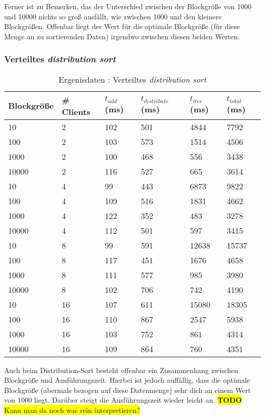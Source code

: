 \documentclass[fontsize=12pt,a4paper,headinclude=no,headings=small]{scrartcl}
\newcommand{\todo}[1]{\colorbox{yellow}{\textbf{TODO} #1}}
\begin{document}
Ferner ist zu Bemerken, das der Unterschied zwischen der Blockgröße von 1000 und 10000 nichts so groß ausfällt, wie zwischen 1000 und den kleinere Blockgrößen. Offenbar liegt der Wert für die optimale Blockgröße (für diese Menge an zu sortierenden Daten) irgendwo zwischen diesen beiden Werten.

\subsubsection{Verteiltes \textit{distribution sort}}
\begin{table}[htp]
\begin{tabularx}{\textwidth}{ |X|X|X|X|X|X| }
\hline
Blockgröße & \# Clients & $t_{add}$ (ms) & $t_{distribute}$ (ms) & $t_{iter}$ (ms) & $t_{total}$ (ms) \\
\hline
10 & 2 & 102 & 501 & 4844 & 7792 \\
100 & 2 & 103 & 573 & 1514 & 4506 \\
1000 & 2 & 100 & 468 & 556 & 3438 \\
10000 & 2 & 116 & 527 & 665 & 3614 \\
\hline
10 & 4 & 99 & 443 & 6873 & 9822 \\ 
100 & 4 & 109 & 516 & 1831 & 4662 \\ 
1000 & 4 & 122 & 352 & 483 & 3278 \\ 
10000 & 4 & 112 & 501 & 597 & 3415 \\
\hline
10 & 8 & 99 & 591 & 12638 & 15737 \\
100 & 8 & 117 & 451 & 1676 & 4658 \\
1000 & 8 & 111 & 577 & 985 & 3980 \\
10000 & 8 & 102 & 706 & 742 & 4190 \\
\hline
10 & 16 & 107 & 611 & 15080 & 18305 \\
100 & 16 & 110 & 867 & 2547 & 5938 \\
1000 & 16 & 103 & 752 & 861 & 4314 \\
10000 & 16 & 109 & 864 & 760 & 4351 \\
\hline
\end{tabularx}
\caption{Ergenisdaten : Verteiltes \textit{distribution sort}}
\end{table}
Auch beim Distribution-Sort besteht offenbar ein Zusammenhang zwischen Blockgröße und Ausführungszeit. Hierbei ist jedoch auffällig, dass die optimale Blockgröße (abermals bezogen auf diese Datenmenge) sehr dich an einem Wert von 1000 liegt. Darüber steigt die Ausführungszeit wieder leicht an. \todo{Kann man da noch was rein interpretieren?} 
\end{document}
